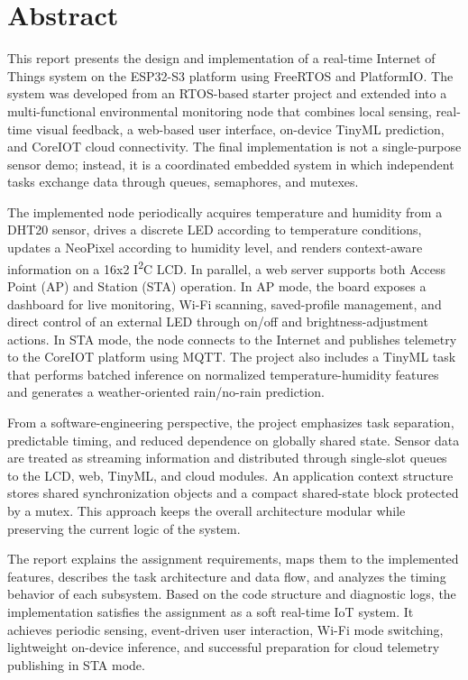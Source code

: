 \section*{Abstract}
This report presents the design and implementation of a real-time Internet of
Things system on the ESP32-S3 platform using FreeRTOS and PlatformIO. The
system was developed from an RTOS-based starter project and extended into a
multi-functional environmental monitoring node that combines local sensing,
real-time visual feedback, a web-based user interface, on-device TinyML
prediction, and CoreIOT cloud connectivity. The final implementation is not a
single-purpose sensor demo; instead, it is a coordinated embedded system in
which independent tasks exchange data through queues, semaphores, and mutexes.

The implemented node periodically acquires temperature and humidity from a
DHT20 sensor, drives a discrete LED according to temperature conditions,
updates a NeoPixel according to humidity level, and renders context-aware
information on a 16x2 I\textsuperscript{2}C LCD. In parallel, a web server
supports both Access Point (AP) and Station (STA) operation. In AP mode, the
board exposes a dashboard for live monitoring, Wi-Fi scanning, saved-profile
management, and direct control of an external LED through on/off and
brightness-adjustment actions. In STA mode, the node connects to the Internet
and publishes telemetry to the CoreIOT platform using MQTT. The project also
includes a TinyML task that performs batched inference on normalized
temperature-humidity features and generates a weather-oriented rain/no-rain
prediction.

From a software-engineering perspective, the project emphasizes task
separation, predictable timing, and reduced dependence on globally shared
state. Sensor data are treated as streaming information and distributed through
single-slot queues to the LCD, web, TinyML, and cloud modules. An application
context structure stores shared synchronization objects and a compact
shared-state block protected by a mutex. This approach keeps the overall
architecture modular while preserving the current logic of the system.

The report explains the assignment requirements, maps them to the implemented
features, describes the task architecture and data flow, and analyzes the
timing behavior of each subsystem. Based on the code structure and diagnostic
logs, the implementation satisfies the assignment as a soft real-time IoT
system. It achieves periodic sensing, event-driven user interaction, Wi-Fi
mode switching, lightweight on-device inference, and successful preparation for
cloud telemetry publishing in STA mode.

\clearpage
